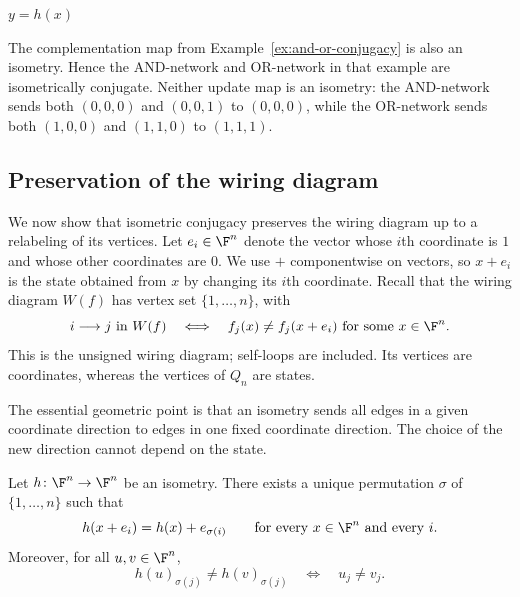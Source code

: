 \begin{example}
\begin{center}
\begin{minipage}{0.46\linewidth}
            \small $y=h(x)$
        \end{minipage}
    \end{center}

    The complementation map from Example~\ref{ex:and-or-conjugacy} is also an isometry. Hence the AND-network and OR-network in that example are isometrically conjugate. Neither update map is an isometry: the AND-network sends both $(0,0,0)$ and $(0,0,1)$ to $(0,0,0)$, while the OR-network sends both $(1,0,0)$ and $(1,1,0)$ to $(1,1,1)$.
\end{example}

\subsection{Preservation of the wiring diagram}

We now show that isometric conjugacy preserves the wiring diagram up to a relabeling of its vertices. Let $e_i\in\F^n$ denote the vector whose $i$th coordinate is $1$ and whose other coordinates are $0$. We use $+$ componentwise on vectors, so $x+ e_i$ is the state obtained from $x$ by changing its $i$th coordinate. Recall that the wiring diagram $W(f)$ has vertex set $\{1,\dots,n\}$, with
\begin{equation}\label{eq:essential-dependence}
    i\longrightarrow j\text{ in }W(f)
    \quad\Longleftrightarrow\quad
    f_j(x)\ne f_j(x+ e_i)\text{ for some }x\in\F^n.
\end{equation}
This is the unsigned wiring diagram; self-loops are included. Its vertices are coordinates, whereas the vertices of $Q_n$ are states.

The essential geometric point is that an isometry sends all edges in a given coordinate direction to edges in one fixed coordinate direction. The choice of the new direction cannot depend on the state.

\begin{lemma}\label{lem:isometry-directions}
    Let $h\colon\F^n\to\F^n$ be an isometry. There exists a unique permutation $\sigma$ of $\{1,\dots,n\}$ such that
    \begin{equation}\label{eq:isometry-directions}
        h(x+ e_i)=h(x)+ e_{\sigma(i)}
        \qquad\text{for every }x\in\F^n\text{ and every }i.
    \end{equation}
    Moreover, for all $u,v\in\F^n$,
    \begin{equation}\label{eq:isometry-coordinate-differences}
        h(u)_{\sigma(j)}\ne h(v)_{\sigma(j)}
        \quad\Longleftrightarrow\quad u_j\ne v_j.
    \end{equation}
\end{lemma}

